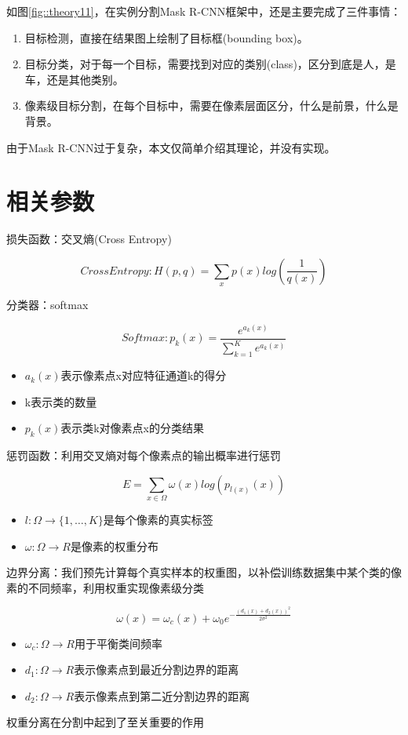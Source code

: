 如图\ref{fig::theory11}，在实例分割Mask R-CNN框架中，还是主要完成了三件事情：

\begin{enumerate}
\def\labelenumi{\arabic{enumi}.}
\tightlist
\item
  目标检测，直接在结果图上绘制了目标框(bounding box)。
\item
  目标分类，对于每一个目标，需要找到对应的类别(class)，区分到底是人，是车，还是其他类别。
\item
  像素级目标分割，在每个目标中，需要在像素层面区分，什么是前景，什么是背景。
\end{enumerate}

由于Mask R-CNN过于复杂，本文仅简单介绍其理论，并没有实现。

\section{相关参数}\label{ux76f8ux5173ux53c2ux6570}

损失函数：交叉熵(Cross Entropy)

\[Cross Entropy: H(p, q) = \sum_xp(x)log(\frac{1}{q(x)})\]

分类器：softmax

\[Softmax: p_k(x) = \frac{e^{a_k(x)}}{\sum^K_{k=1}e^{a_k(x)}}\]

\begin{itemize}
\tightlist
\item
  \(a_k(x)\)表示像素点x对应特征通道k的得分
\item
  k表示类的数量
\item
  \(p_k(x)\)表示类k对像素点x的分类结果
\end{itemize}

惩罚函数：利用交叉熵对每个像素点的输出概率进行惩罚

\[E = \sum_{x\in\Omega}\omega(x)log(p_{l(x)}(x))\]

\begin{itemize}
\tightlist
\item
  \(l: \Omega\longrightarrow\{1, …, K\}\)是每个像素的真实标签
\item
  \(\omega: \Omega\longrightarrow R\)是像素的权重分布
\end{itemize}

边界分离：我们预先计算每个真实样本的权重图，以补偿训练数据集中某个类的像素的不同频率，利用权重实现像素级分类

\[\omega(x) = \omega_c(x)+\omega_0e^{-\frac{(d_1(x)+d_2(x))^2}{2\sigma^2}}\]

\begin{itemize}
\tightlist
\item
  \(\omega_c: \Omega\longrightarrow R\)用于平衡类间频率
\item
  \(d_1: \Omega\longrightarrow R\)表示像素点到最近分割边界的距离
\item
  \(d_2: \Omega\longrightarrow R\)表示像素点到第二近分割边界的距离
\end{itemize}

权重分离在分割中起到了至关重要的作用
